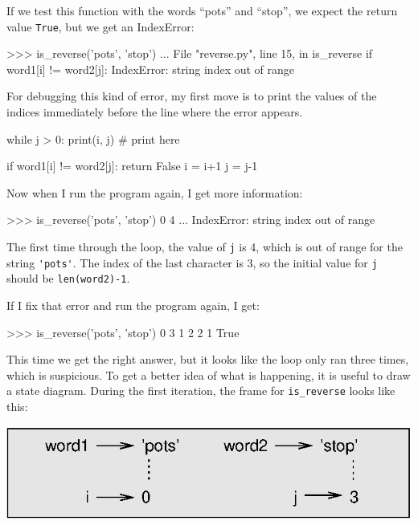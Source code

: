 If we test this function with the words ``pots'' and ``stop'', we
expect the return value {\tt True}, but we get an IndexError:


\beforeverb
\begin{pyinterpreter}
>>> is_reverse('pots', 'stop')
...
  File "reverse.py", line 15, in is_reverse
    if word1[i] != word2[j]:
IndexError: string index out of range
\end{pyinterpreter}
\afterverb
%
For debugging this kind of error, my first move is to
print the values of the indices immediately before the line
where the error appears.

\beforeverb
\begin{pycode}
    while j > 0:
        print(i, j)        # print here
        
        if word1[i] != word2[j]:
            return False
        i = i+1
        j = j-1
\end{pycode}
\afterverb
%
Now when I run the program again, I get more information:

\beforeverb
\begin{pyinterpreter}
>>> is_reverse('pots', 'stop')
0 4
...
IndexError: string index out of range
\end{pyinterpreter}
\afterverb
%
The first time through the loop, the value of {\tt j} is 4,
which is out of range for the string \verb"'pots'".
The index of the last character is 3, so the
initial value for {\tt j} should be {\tt len(word2)-1}.


If I fix that error and run the program again, I get:

\beforeverb
\begin{pyinterpreter}
>>> is_reverse('pots', 'stop')
0 3
1 2
2 1
True
\end{pyinterpreter}
\afterverb
%
This time we get the right answer, but it looks like the loop only ran
three times, which is suspicious.  To get a better idea of what is
happening, it is useful to draw a state diagram.  During the first
iteration, the frame for \verb"is_reverse" looks like this:


\beforefig
\centerline{\includegraphics{figs/state4.eps}}
\afterfig

